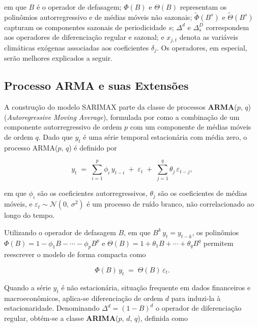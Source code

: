 \noindent em que $B$ é o operador de defasagem; $\Phi(B)$ e $\Theta(B)$ representam os polinômios autorregressivo e de médias móveis não sazonais; $\tilde{\Phi}(B^s)$ e $\tilde{\Theta}(B^s)$ capturam os componentes sazonais de periodicidade $s$; $\Delta^d$ e $\Delta_s^D$ correspondem aos operadores de diferenciação regular e sazonal; e $x_{j,t}$ denota as variáveis climáticas exógenas associadas aos coeficientes $\delta_j$. Os operadores, em especial, serão melhores explicados a seguir. 

\subsection{Processo ARMA e suas Extensões}
\label{sec:arma}
 
A construção do modelo SARIMAX parte da classe de processos
\textbf{ARMA}(\(p,\,q\)) (\textit{Autoregressive Moving Average}),
formulada por \citet{box2015} como a combinação de um componente
autorregressivo de ordem \(p\) com um componente de médias móveis de ordem
\(q\). Dado que \(y_t\) é uma série temporal estacionária com média zero, o
processo ARMA(\(p,\,q\)) é definido por
 
\begin{equation}
  y_t \;=\; \sum_{i=1}^{p} \phi_i\, y_{t-i}
           \;+\; \varepsilon_t
           \;+\; \sum_{j=1}^{q} \theta_j\, \varepsilon_{t-j},
  \label{eq:arma}
\end{equation}
 
\noindent
em que \(\phi_i\) são os coeficientes autorregressivos, \(\theta_j\) são os
coeficientes de médias móveis, e \(\varepsilon_t \sim \mathcal{N}(0,\,\sigma^2)\)
é um processo de ruído branco, não correlacionado ao longo do tempo.
 
Utilizando o operador de defasagem \(B\), em que \(B^k\,y_t = y_{t-k}\),
os polinômios \(\Phi(B) = 1 - \phi_1 B - \cdots - \phi_p B^p\) e
\(\Theta(B) = 1 + \theta_1 B + \cdots + \theta_q B^q\) permitem reescrever
o modelo de forma compacta como
 
\begin{equation}
  \Phi(B)\,y_t \;=\; \Theta(B)\,\varepsilon_t.
  \label{eq:arma_compact}
\end{equation}
 
Quando a série \(y_t\) é não estacionária, situação frequente em dados
financeiros e macroeconômicos, aplica-se diferenciação de ordem \(d\)
para induzi-la à estacionaridade. Denominando \(\Delta^d = (1-B)^d\) o
operador de diferenciação regular, obtém-se a classe
\textbf{ARIMA}(\(p,\,d,\,q\)), definida como 
 

